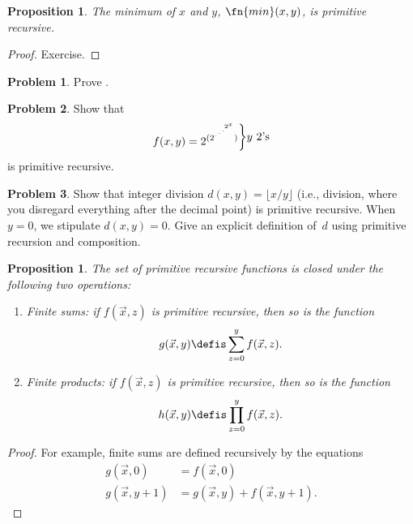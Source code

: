 \documentclass[10pt,a4paper]{article}
\makeatletter
\theoremstyle{plain}
\newtheorem{prop}[thm]{Proposition}
\theoremstyle{definition}
\newtheorem{prob}{Problem}[section]
\theoremstyle{remark}
\newcommand*{\ollabel}[1]{\label{#1}}
\newcommand{\olref}{\@ifnextchar[{\olref@i}{\olref@final}}
\def\olref@i[#1]{\@ifnextchar[{\olref@ii}{\olref@final}}
\def\olref@ii[#1]{\@ifnextchar[{\olref@iii}{\olref@final}}
\def\olref@iii[#1]{\olref@final}
\def\olref@final#1{\ref{#1}}
\makeatother
\begin{document}
\begin{prop}
  \ollabel{prop:min-pr}
  The minimum of $x$ and $y$, $\fn{min}(x,y)$, is primitive recursive.
\end{prop}

\begin{proof}
  Exercise.
\end{proof}

\begin{prob}
  Prove \olref[cmp][rec][exa]{prop:min-pr}.
\end{prob}

\begin{prob}
Show that \[
f(x, y) =
2^{(2^{\iddots^{2^{x}}})}\raisebox{1ex}{\bigg\rbrace}
\raisebox{1ex}{\text {$y$ $2$'s}}\] is primitive recursive.
\end{prob}

\begin{prob}
Show that integer division $d(x, y) = \lfloor x/y \rfloor$ (i.e.,
division, where you disregard everything after the decimal point) is
primitive recursive. When $y = 0$, we stipulate $d(x, y) = 0$. Give an
explicit definition of~$d$ using primitive recursion and
composition.
\end{prob}

\begin{prop}
The set of primitive recursive functions is closed under the
following two operations:
\begin{enumerate}
\item Finite sums: if $f(\vec x, z)$ is primitive recursive, then so
is the function
\[
g(\vec x, y) \defis \sum_{z = 0}^y f(\vec x, z).
\]
\item Finite products: if $f(\vec x, z)$ is primitive recursive, then
so is the function
\[
h(\vec x, y) \defis \prod_{z = 0}^y f(\vec x, z).
\]
\end{enumerate}
\end{prop}

\begin{proof}
For example, finite sums are defined recursively by the equations
\begin{align*}
  g(\vec x, 0) & = f(\vec x, 0)\\
  g(\vec x, y+1) & = g(\vec x, y) + f(\vec x, y+1).
\end{align*}
\end{proof}



\end{document}
